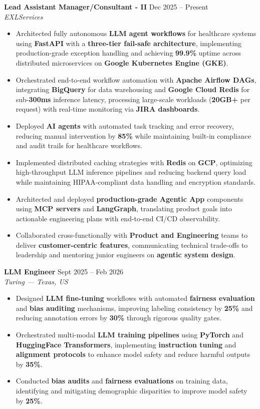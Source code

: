 \documentclass[11pt,a4paper]{article}
\newcommand{\jobentry}[3]{%
  \vspace{5pt}%
  \noindent\textbf{#1} \hfill #3\\%
  \textit{#2}%
}
\begin{document}
\jobentry{Lead Assistant Manager/Consultant - II}{EXLServices}{Dec 2025 -- Present}
\begin{itemize}
\item Architected fully autonomous \textbf{LLM agent workflows} for healthcare systems using \textbf{FastAPI} with a \textbf{three-tier fail-safe architecture}, implementing production-grade exception handling and achieving \textbf{99.9\%} uptime across distributed microservices on \textbf{Google Kubernetes Engine (GKE)}.
\item Orchestrated end-to-end workflow automation with \textbf{Apache Airflow DAGs}, integrating \textbf{BigQuery} for data warehousing and \textbf{Google Cloud Redis} for sub-\textbf{300ms} inference latency, processing large-scale workloads (\textbf{20GB+} per request) with real-time monitoring via \textbf{JIRA dashboards}.
\item Deployed \textbf{AI agents} with automated task tracking and error recovery, reducing manual intervention by \textbf{85\%} while maintaining built-in compliance and audit trails for healthcare workflows.
\item Implemented distributed caching strategies with \textbf{Redis} on \textbf{GCP}, optimizing high-throughput LLM inference pipelines and reducing backend query load while maintaining HIPAA-compliant data handling and encryption standards.
\item Architected and deployed \textbf{production-grade Agentic App} components using \textbf{MCP servers} and \textbf{LangGraph}, translating product goals into actionable engineering plans with end-to-end CI/CD observability.
\item Collaborated cross-functionally with \textbf{Product and Engineering} teams to deliver \textbf{customer-centric features}, communicating technical trade-offs to leadership and mentoring junior engineers on \textbf{agentic system design}.
\end{itemize}

\jobentry{LLM Engineer}{Turing — Texas, US}{Sept 2025 -- Feb 2026}
\begin{itemize}
\item Designed \textbf{LLM fine-tuning} workflows with automated \textbf{fairness evaluation} and \textbf{bias auditing} mechanisms, improving labeling consistency by \textbf{25\%} and reducing annotation errors by \textbf{30\%} through rigorous quality gates.
\item Orchestrated multi-modal \textbf{LLM training pipelines} using \textbf{PyTorch} and \textbf{HuggingFace Transformers}, implementing \textbf{instruction tuning} and \textbf{alignment protocols} to enhance model safety and reduce harmful outputs by \textbf{35\%}.
\item Conducted \textbf{bias audits} and \textbf{fairness evaluations} on training data, identifying and mitigating demographic disparities to improve model safety by \textbf{25\%}.
\end{itemize}
\end{document}
